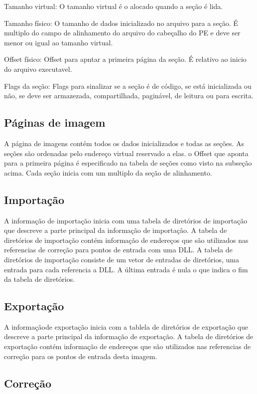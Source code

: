 Tamanho virtual: O tamanho virtual é o alocado quando a seção é lida.


Tamanho físico: O tamanho de dados inicializado no arquivo para a
seção. É multiplo do campo de alinhamento do arquivo do cabeçalho
do PE e deve ser menor ou igual ao tamanho virtual.


Offset físico: Offset para apntar a primeira página da seção. É relativo
ao inicio do arquivo executavel.


Flags da seção: Flags para sinalizar se a seção é de código, se está
inicializada ou não, se deve ser armazezada, compartilhada, paginável,
de leitura ou para escrita.


\subsection{Páginas de imagem}


A página de imagens contém todos os dados inicializados e todas as
seções. As seções são ordenadas pelo endereço virtual reservado a
elas. o Offset que aponta para a primeira página é especificado na
tabela de seções como visto na subseção acima. Cada seção inicia com
um multiplo da seção de alinhamento.


\subsection{Importação}


A informação de importação inicia com uma tabela de diretórios de
importação que descreve a parte principal da informação de importação.
A tabela de diretórios de importação contém informação de endereços
que são utilizados nas referencias de correção para pontos de entrada
com uma DLL. A tabela de diretórios de importação consiste de um vetor
de entradas de diretórios, uma entrada para cada referencia a DLL.
A última entrada é nula o que indica o fim da tabela de diretórios.


\subsection{Exportação}


A informaçãode exportação inicia com a tablela de diretórios de exportação
que descreve a parte principal da informação de exportação. A tabela
de diretórios de exportação contém informação de endereços que são
utilizados nas referencias de correção para os pontos de entrada desta
imagem.


\subsection{Correção}


